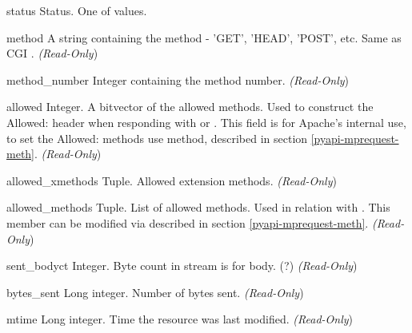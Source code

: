 \begin{memberdesc}[request]{status}
  Status. One of  values.
\end{memberdesc}

\begin{memberdesc}[request]{method}
  A string containing the method - 'GET', 'HEAD', 'POST', etc.
  Same as CGI .
  \emph{(Read-Only})
\end{memberdesc}

\begin{memberdesc}[request]{method_number}
  Integer containing the method number.
  \emph{(Read-Only})
\end{memberdesc}

\begin{memberdesc}[request]{allowed}
  Integer. A bitvector of the allowed methods. Used to construct the
  Allowed: header when responding with
   or
  . This field is for Apache's internal
  use, to set the Allowed: methods use 
  method, described in section \ref{pyapi-mprequest-meth}. 
  \emph{(Read-Only})
\end{memberdesc}

\begin{memberdesc}[request]{allowed_xmethods}
  Tuple. Allowed extension methods.
  \emph{(Read-Only})
\end{memberdesc}

\begin{memberdesc}[request]{allowed_methods}
  Tuple. List of allowed methods. Used in relation with
  . This member can be modified via  
  described in section \ref{pyapi-mprequest-meth}.
  \emph{(Read-Only})
\end{memberdesc}

\begin{memberdesc}[request]{sent_bodyct}
  Integer. Byte count in stream is for body. (?)
  \emph{(Read-Only})
\end{memberdesc}

\begin{memberdesc}[request]{bytes_sent}
  Long integer. Number of bytes sent.
  \emph{(Read-Only})
\end{memberdesc}

\begin{memberdesc}[request]{mtime}
  Long integer. Time the resource was last modified.
  \emph{(Read-Only})
\end{memberdesc}

